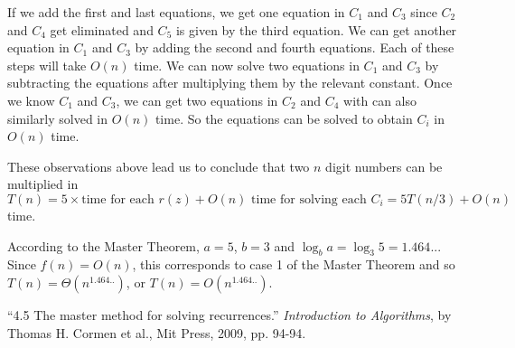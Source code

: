 \documentclass[addpoints]{exam}
\begin{document}
\begin{questions}
\begin{parts}
If we add the first and last equations, we get one equation in $C_1$ and $C_3$ since $C_2$ and $C_4$ get eliminated and $C_5$ is given by the third equation. We can get another equation in $C_1$ and $C_3$ by adding the second and fourth equations. Each of these steps will take $O(n)$ time. We can now solve two equations in $C_1$ and $C_3$ by subtracting the equations after multiplying them by the relevant constant. Once we know $C_1$ and $C_3$, we can get two equations in $C_2$ and $C_4$ with can also similarly solved in $O(n)$ time. So the equations can be solved to obtain $C_i$ in $O(n)$ time.

These observations above lead us to conclude that two $n$ digit numbers can be multiplied in $T(n) = 5 \times \text{time for each $r(z)$} + \text{$O(n)$ time for solving each $C_i$} =5 T(n/3) + O(n)$ time.

According to the Master Theorem, $a=5$, $b=3$ and $\log_b a = \log_3 5 = 1.464..$. Since $f(n) = O(n)$, this corresponds to case 1 of the Master Theorem and so $T(n) = \Theta(n^{1.464..})$, or  $T(n) =O(n^{1.464..})$.

\end{parts}

\end{questions}

\begin{thebibliography}{9}

 \enquote{4.5 The master method for solving recurrences.} \textit{Introduction to Algorithms}, by Thomas H. Cormen et al., Mit Press, 2009, pp. 94-94.

\end{thebibliography}
\end{document}
